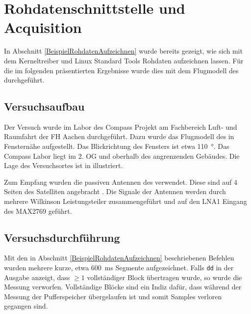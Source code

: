 \section{Rohdatenschnittstelle und Acquisition}
In Abschnitt \ref{BeispielRohdatenAufzeichnen} wurde bereits gezeigt, wie sich mit dem Kerneltreiber und Linux Standard Tools Rohdaten aufzeichnen lassen. Für die im folgenden präsentierten Ergebnisse wurde dies mit dem Flugmodell des \dscubesat durchgeführt.

\subsection{Versuchsaufbau}
Der Versuch wurde im Labor des Compass Projekt am Fachbereich Luft- und Raumfahrt der FH Aachen durchgeführt. Dazu wurde das Flugmodell des \dscubesat in Fensternähe aufgestellt. Das Blickrichtung des Fensters ist etwa \SI{110}{\degree}. Das Compass Labor liegt im 2. OG und oberhalb des angrenzenden Gebäudes. Die Lage des Versuchsortes ist in  illustriert.

Zum Empfang wurden die passiven Antennen des \dscubesat verwendet. Diese sind auf 4 Seiten des Satelliten angebracht . Die Signale der Antennen werden durch mehrere Wilkinson Leistungsteiler zusammengeführt und auf den LNA1 Eingang des MAX2769 geführt.



\subsection{Versuchsdurchführung}
Mit den in Abschnitt \ref{BeispielRohdatenAufzeichnen} beschriebenen Befehlen wurden mehrere kurze, etwa \SI{600}{\milli\second} Segmente aufgezeichnet. Falls \lstinline$dd$ in der Ausgabe anzeigt, dass $\geq 1$ vollständiger Block übertragen wurde, so wurde die Messung verworfen. Vollständige Blöcke sind ein Indiz dafür, dass während der Messung der Pufferspeicher übergelaufen ist und somit Samples verloren gegangen sind.


